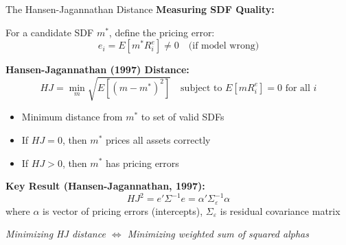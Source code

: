 \documentclass{beamer}
\begin{document}
\begin{frame}{The Hansen-Jagannathan Distance}
    \textbf{Measuring SDF Quality:}
    
    For a candidate SDF $m^*$, define the pricing error:
    \begin{equation*}
        e_i = E[m^* R^e_i] \neq 0 \quad \text{(if model wrong)}
    \end{equation*}
    
    
    \textbf{Hansen-Jagannathan (1997) Distance:}
    \begin{equation}\label{eq:hj_distance}
        HJ = \min_m \sqrt{E[(m - m^*)^2]} \quad \text{subject to } E[m R^e_i] = 0 \text{ for all } i
    \end{equation}
    
    \begin{itemize}
        \item Minimum distance from $m^*$ to set of valid SDFs
        \item If $HJ = 0$, then $m^*$ prices all assets correctly
        \item If $HJ > 0$, then $m^*$ has pricing errors
    \end{itemize}
    
    \vspace{0.3cm}
    \textbf{Key Result (Hansen-Jagannathan, 1997):}
    \begin{equation}\label{eq:hj_alpha}
        HJ^2 = e' \Sigma^{-1} e = \alpha' \Sigma_\varepsilon^{-1} \alpha
    \end{equation}
    where $\alpha$ is vector of pricing errors (intercepts), $\Sigma_\varepsilon$ is residual covariance matrix
    
    
    \textit{Minimizing HJ distance $\Leftrightarrow$ Minimizing weighted sum of squared alphas}
\end{frame}
\end{document}
